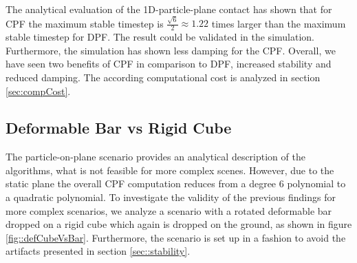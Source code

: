 The analytical evaluation of the 1D-particle-plane contact has shown that for CPF the maximum stable timestep is $\frac{\sqrt{6}}{2}\approx1.22$ times larger than the maximum stable timestep for DPF.
The result could be validated in the simulation. Furthermore, the simulation has shown less damping for the CPF. Overall, we have seen two benefits of CPF in comparison to DPF, increased stability and reduced damping. The according computational cost is analyzed in section \ref{sec:compCost}.

\subsection{Deformable Bar vs Rigid Cube}
The particle-on-plane scenario provides an analytical description of the algorithms, what is not feasible for more complex scenes.
However, due to the static plane the overall CPF computation reduces from a degree 6 polynomial to a quadratic polynomial. To investigate the validity of the previous findings for more complex scenarios, we analyze a scenario with a rotated deformable bar dropped on a rigid cube which again is dropped on the ground, as shown in figure \ref{fig::defCubeVsBar}. Furthermore, the scenario is set up in a fashion to avoid the artifacts presented in section \ref{sec::stability}.

